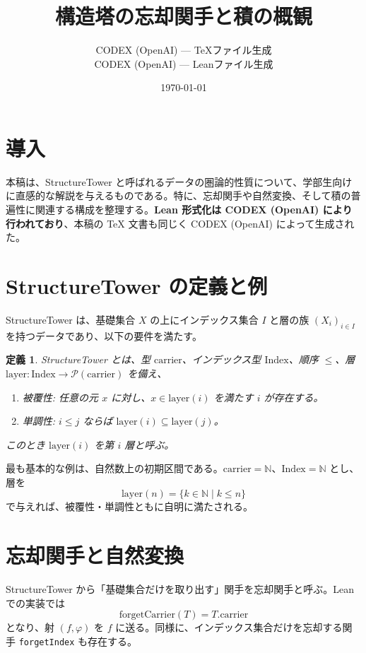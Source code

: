 \documentclass[a4paper]{ltjsarticle}
\title{構造塔の忘却関手と積の概観}
\author{CODEX (OpenAI) --- TeXファイル生成\\CODEX (OpenAI) --- Leanファイル生成}
\date{\today}
\newtheorem{definition}{定義}[section]
\begin{document}
\maketitle

\section{導入}

本稿は、StructureTower と呼ばれるデータの圏論的性質について、学部生向けに直感的な解説を与えるものである。特に、忘却関手や自然変換、そして積の普遍性に関連する構成を整理する。\textbf{Lean 形式化は CODEX (OpenAI) により行われており}、本稿の TeX 文書も同じく CODEX (OpenAI) によって生成された。

\section{StructureTower の定義と例}

StructureTower は、基礎集合 $X$ の上にインデックス集合 $I$ と層の族 $(X_i)_{i\in I}$ を持つデータであり、以下の要件を満たす。

\begin{definition}
StructureTower とは、型 $\mathrm{carrier}$、インデックス型 $\mathrm{Index}$、順序 $\leq$、層 $\mathrm{layer} : \mathrm{Index} \to \mathcal{P}(\mathrm{carrier})$ を備え、
\begin{enumerate}[label=\arabic*)]
  \item 被覆性: 任意の元 $x$ に対し、$x \in \mathrm{layer}(i)$ を満たす $i$ が存在する。
  \item 単調性: $i \leq j$ ならば $\mathrm{layer}(i) \subseteq \mathrm{layer}(j)$。
\end{enumerate}
このとき $\mathrm{layer}(i)$ を第 $i$ 層と呼ぶ。
\end{definition}

最も基本的な例は、自然数上の初期区間である。$\mathrm{carrier} = \mathbb{N}$、$\mathrm{Index} = \mathbb{N}$ とし、層を
\[
  \mathrm{layer}(n) = \{ k \in \mathbb{N} \mid k \leq n \}
\]
で与えれば、被覆性・単調性ともに自明に満たされる。

\section{忘却関手と自然変換}

StructureTower から「基礎集合だけを取り出す」関手を忘却関手と呼ぶ。Lean での実装では
\[
  \mathrm{forgetCarrier}(T) = T.\mathrm{carrier}
\]
となり、射 $(f,\varphi)$ を $f$ に送る。同様に、インデックス集合だけを忘却する関手 \texttt{forgetIndex} も存在する。
\end{document}
